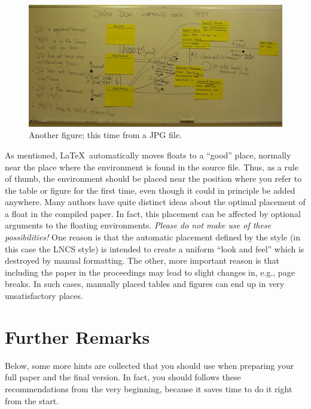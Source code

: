 \documentclass[runningheads,a4paper,oribibl]{llncs}
\begin{document}
\begin{figure}
   \centering
   \includegraphics[width=\textwidth]{example_picture} %
   \caption{Another figure; this time from a JPG file.\label{fig:picture}}
\end{figure}

As mentioned, \LaTeX\ automatically moves floats to a ``good'' place, normally near
the place where the environment is found in the source file. Thus, as a rule of thumb,
the environment should be placed near the position where you refer to the table or figure
for the first time, even though it could in principle be added anywhere. Many authors
have quite distinct ideas about the optimal placement of a float in the compiled paper.
In fact, this placement can be affected by optional arguments to the floating
environments. \emph{Please do not make use of these possibilities!} One reason is that
the automatic placement defined by the style (in this case the LNCS style) is intended
to create a uniform ``look and feel'' which is destroyed by manual formatting. The other,
more important reason is that including the paper in the proceedings may lead to
slight changes in, e.g., page breaks. In such cases, manually placed tables and figures
can end up in very unsatisfactory places.

\section{Further Remarks}

Below, some more hints are collected that you should use when preparing your full paper
and the final version. In fact, you should follows these recommendations from the very
beginning, because it saves time to do it right from the start.
\end{document}
